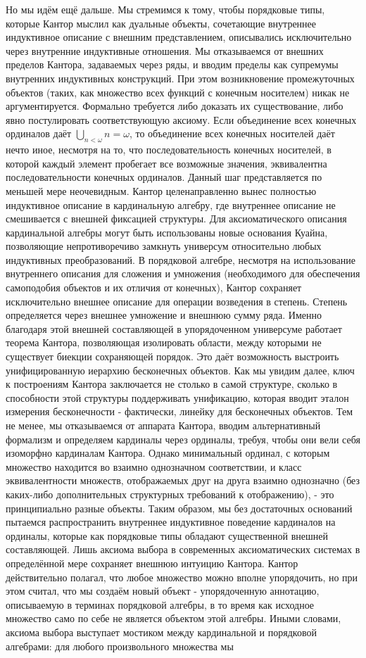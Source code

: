 \documentclass[12pt]{article}
\begin{document}
Но мы идём ещё дальше. Мы стремимся к тому, чтобы порядковые типы, которые Кантор мыслил как дуальные объекты, сочетающие внутреннее индуктивное описание с внешним представлением, описывались исключительно через внутренние индуктивные отношения. Мы отказываемся от внешних пределов Кантора, задаваемых через ряды, и вводим пределы как супремумы внутренних индуктивных конструкций. При этом возникновение промежуточных объектов (таких, как множество всех функций с конечным носителем) никак не аргументируется. Формально требуется либо доказать их существование, либо явно постулировать соответствующую аксиому. Если объединение всех конечных ординалов даёт $\bigcup_{n < \omega} n = \omega$, то объединение всех конечных носителей даёт нечто иное, несмотря на то, что последовательность конечных носителей, в которой каждый элемент пробегает все возможные значения, эквивалентна последовательности конечных ординалов. Данный шаг представляется по меньшей мере неочевидным. Кантор целенаправленно вынес полностью индуктивное описание в кардинальную алгебру, где внутреннее описание не смешивается с внешней фиксацией структуры. Для аксиоматического описания кардинальной алгебры могут быть использованы новые основания Куайна, позволяющие непротиворечиво замкнуть универсум относительно любых индуктивных преобразований. В порядковой алгебре, несмотря на использование внутреннего описания для сложения и умножения (необходимого для обеспечения самоподобия объектов и их отличия от конечных), Кантор сохраняет исключительно внешнее описание для операции возведения в степень. Степень определяется через внешнее умножение и внешнюю сумму ряда. Именно благодаря этой внешней составляющей в упорядоченном универсуме работает теорема Кантора, позволяющая изолировать области, между которыми не существует биекции сохраняющей порядок. Это даёт возможность выстроить унифицированную иерархию бесконечных объектов. Как мы увидим далее, ключ к построениям Кантора заключается не столько в самой структуре, сколько в способности этой структуры поддерживать унификацию, которая вводит эталон измерения бесконечности - фактически, линейку для бесконечных объектов. Тем не менее, мы отказываемся от аппарата Кантора, вводим альтернативный формализм и определяем кардиналы через ординалы, требуя, чтобы они вели себя изоморфно кардиналам Кантора. Однако минимальный ординал, с которым множество находится во взаимно однозначном соответствии, и класс эквивалентности множеств, отображаемых друг на друга взаимно однозначно (без каких-либо дополнительных структурных требований к отображению), - это принципиально разные объекты. Таким образом, мы без достаточных оснований пытаемся распространить внутреннее индуктивное поведение кардиналов на ординалы, которые как порядковые типы обладают существенной внешней составляющей. Лишь аксиома выбора в современных аксиоматических системах в определённой мере сохраняет внешнюю интуицию Кантора. Кантор действительно полагал, что любое множество можно вполне упорядочить, но при этом считал, что мы создаём новый объект - упорядоченную аннотацию, описываемую в терминах порядковой алгебры, в то время как исходное множество само по себе не является объектом этой алгебры. Иными словами, аксиома выбора выступает мостиком между кардинальной и порядковой алгебрами: для любого произвольного множества мы 
\end{document}
